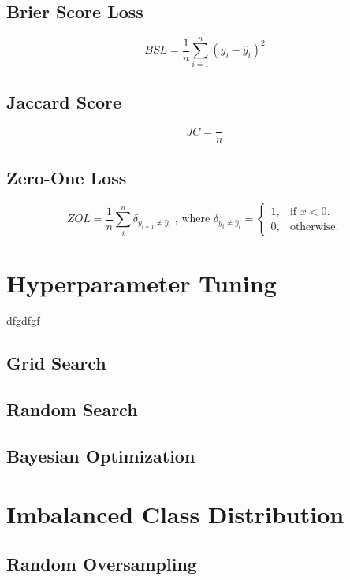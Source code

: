\subsection{Brier Score Loss}

\begin{equation}\label{eq}
    BSL = \frac{1}{n} \sum_{i=1}^{n} (y_i - \hat{y}_i)^2
\end{equation}


\subsection{Jaccard Score}


\begin{equation}\label{eq}
    JC = \frac{}{n}
\end{equation}


\subsection{Zero-One Loss}

\begin{equation}\label{eq}
    ZOL = \frac{1}{n} \sum_{i}^{n} \delta_{y_{i=1} \neq \hat{y}_{i}} \text{ , where } \delta_{y_{i} \neq \hat{y}_{i}} = \begin{cases}
        1, & \text{if $x<0$}.\\
        0, & \text{otherwise}.
      \end{cases}
\end{equation}
\section{Hyperparameter Tuning}

dfgdfgf

\subsection{Grid Search}
\subsection{Random Search}
\subsection{Bayesian Optimization}
\section{Imbalanced Class Distribution}
\subsection{Random Oversampling}
